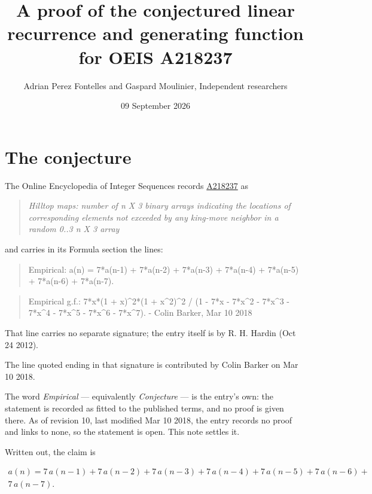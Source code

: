 \documentclass[11pt]{article}
\title{A proof of the conjectured linear recurrence and generating function for OEIS A218237}
\author{Adrian Perez Fontelles and Gaspard Moulinier, Independent researchers}
\date{09 September 2026}
\theoremstyle{definition}
\begin{document}
\maketitle
\section{The conjecture}

The Online Encyclopedia of Integer Sequences records \href{https://oeis.org/A218237}{A218237} as

\begin{quote}\itshape Hilltop maps: number of n X 3 binary arrays indicating the locations of corresponding elements not exceeded by any king-move neighbor in a random 0..3 n X 3 array\end{quote}

and carries in its Formula section the lines:

\begin{quote}\ttfamily Empirical: a(n) = 7*a(n-1) + 7*a(n-2) + 7*a(n-3) + 7*a(n-4) + 7*a(n-5) + 7*a(n-6) + 7*a(n-7).\end{quote}

\begin{quote}\ttfamily Empirical g.f.: 7*x*(1 + x)\textasciicircum{}2*(1 + x\textasciicircum{}2)\textasciicircum{}2 / (1 - 7*x - 7*x\textasciicircum{}2 - 7*x\textasciicircum{}3 - 7*x\textasciicircum{}4 - 7*x\textasciicircum{}5 - 7*x\textasciicircum{}6 - 7*x\textasciicircum{}7). - Colin Barker, Mar 10 2018\end{quote}

That line carries no separate signature; the entry itself is by R. H. Hardin (Oct 24 2012).

The line quoted ending in that signature is contributed by Colin Barker on Mar 10 2018.

The word {\itshape Empirical} --- equivalently {\itshape Conjecture} --- is the entry's own: the statement is recorded as fitted to the published terms, and no proof is given there. As of revision 10, last modified Mar 10 2018, the entry records no proof and links to none, so the statement is open. This note settles it.

Written out, the claim is

\begin{multline*} a(n) = 7\,a(n-1) + 7\,a(n-2) + 7\,a(n-3) + 7\,a(n-4) + 7\,a(n-5) + 7\,a(n-6) + \\ 7\,a(n-7). \end{multline*}
\end{document}
